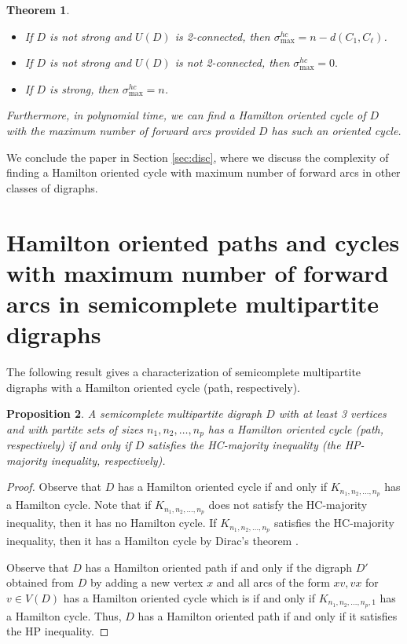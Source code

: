 \documentclass{article}
\newtheorem{theorem}{Theorem}[section]
\newtheorem{proposition}[theorem]{Proposition}
\newcommand{\GGn}[1]{{#1}}
\newcommand{\GGnn}[1]{{#1}}
\newcommand{\2}{\vspace{0.2cm}}
\begin{document}
{\begin{theorem}
\begin{itemize}
\item If $D$ is not strong and $U(D)$ is 2-connected, then $\sigma^{hc}_{\max}= n - d(C_1,C_{\ell})$.
\item If $D$ is not strong and $U(D)$ is not 2-connected, then \GGnn{$\sigma^{hc}_{\max}=0.$}%
\item If $D$ is strong, then $\sigma^{hc}_{\max}= n$.
\end{itemize}

Furthermore, in polynomial time, we can find a Hamilton oriented cycle of $D$ with the maximum number of forward arcs \GGnn{provided $D$ has such an oriented cycle}. 
\end{theorem}
}


\GGn{We conclude the paper in Section \ref{sec:disc}, where we discuss the complexity of finding a Hamilton oriented cycle with maximum number of forward arcs
in other classes of digraphs. }




\section{\GGn{Hamilton oriented paths and cycles with maximum number of forward arcs in semicomplete multipartite digraphs}}\label{sec:3}
The following result gives a characterization of semicomplete multipartite digraphs with a Hamilton oriented cycle (path, respectively).
\begin{proposition}
A semicomplete multipartite digraph $D$ \GGnn{with at least 3 vertices and} with partite sets of sizes $n_1,n_2,\dots ,n_p$ has a Hamilton oriented cycle (path, respectively) if and only if $D$ satisfies the  HC-majority inequality (the  HP-majority inequality, respectively).
\end{proposition}
\begin{proof}
Observe that $D$ has a Hamilton oriented cycle if and only if $K_{n_1,n_2,\dots ,n_p}$ has a Hamilton cycle. Note that if $K_{n_1,n_2,\dots ,n_p}$ does not satisfy the  HC-majority inequality, then it has no Hamilton cycle. If $K_{n_1,n_2,\dots ,n_p}$ satisfies the  HC-majority inequality, then it has a Hamilton cycle by Dirac's theorem \cite{D52}.

Observe that $D$ has a Hamilton oriented path if and only if the digraph $D'$ obtained from $D$ by adding a new vertex $x$ and all arcs of the form $xv,vx$ for $v\in V(D)$ has a Hamilton oriented cycle which is if and only if $K_{n_1,n_2,\dots ,n_p,1}$ has a Hamilton cycle. Thus, $D$ has a Hamilton oriented path if and only if it satisfies the HP inequality.
\end{proof}
\end{document}
